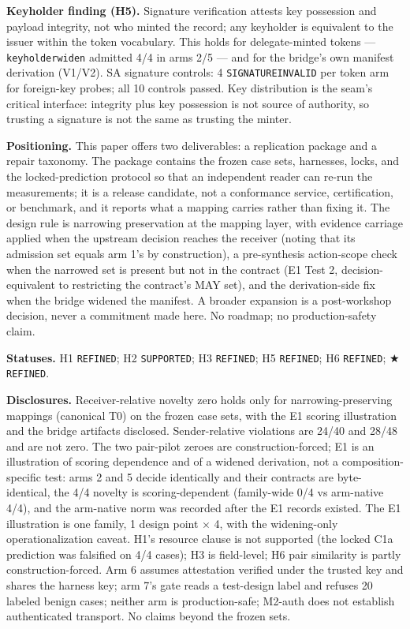 \documentclass[
  10pt,
]{article}
\let\origtexttt\texttt
\renewcommand{\texttt}[1]{{\upshape\origtexttt{#1}}}
\renewcommand{\_}{\allowbreak\origunderscore}
\begin{document}
\textbf{Keyholder finding (H5).} Signature verification attests key
possession and payload integrity, not who minted the record; any
keyholder is equivalent to the issuer within the token vocabulary. This
holds for delegate-minted tokens --- \texttt{keyholder\_widen} admitted
4/4 in arms 2/5 --- and for the bridge's own manifest derivation
(V1/V2). SA signature controls: 4 \texttt{SIGNATURE\_INVALID} per token
arm for foreign-key probes; all 10 controls passed. Key distribution is
the seam's critical interface: integrity plus key possession is not
source of authority, so trusting a signature is not the same as trusting
the minter.

\textbf{Positioning.} This paper offers two deliverables: a replication
package and a repair taxonomy. The package contains the frozen case
sets, harnesses, locks, and the locked-prediction protocol so that an
independent reader can re-run the measurements; it is a release
candidate, not a conformance service, certification, or benchmark, and
it reports what a mapping carries rather than fixing it. The design rule
is narrowing preservation at the mapping layer, with evidence carriage
applied when the upstream decision reaches the receiver (noting that its
admission set equals arm 1's by construction), a pre-synthesis
action-scope check when the narrowed set is present but not in the
contract (E1 Test 2, decision-equivalent to restricting the contract's
MAY set), and the derivation-side fix when the bridge widened the
manifest. A broader expansion is a post-workshop decision, never a
commitment made here. No roadmap; no production-safety claim.

\textbf{Statuses.} H1 \texttt{REFINED}; H2 \texttt{SUPPORTED}; H3
\texttt{REFINED}; H5 \texttt{REFINED}; H6 \texttt{REFINED}; ★
\texttt{REFINED}.

\textbf{Disclosures.} Receiver-relative novelty zero holds only for
narrowing-preserving mappings (canonical T0) on the frozen case sets,
with the E1 scoring illustration and the bridge artifacts disclosed.
Sender-relative violations are 24/40 and 28/48 and are not zero. The two
pair-pilot zeroes are construction-forced; E1 is an illustration of
scoring dependence and of a widened derivation, not a
composition-specific test: arms 2 and 5 decide identically and their
contracts are byte-identical, the 4/4 novelty is scoring-dependent
(family-wide 0/4 vs arm-native 4/4), and the arm-native norm was
recorded after the E1 records existed. The E1 illustration is one
family, 1 design point × 4, with the widening-only operationalization
caveat. H1's resource clause is not supported (the locked C1a prediction
was falsified on 4/4 cases); H3 is field-level; H6 pair similarity is
partly construction-forced. Arm 6 assumes attestation verified under the
trusted key and shares the harness key; arm 7's gate reads a test-design
label and refuses 20 labeled benign cases; neither arm is
production-safe; M2-auth does not establish authenticated transport. No
claims beyond the frozen sets.
\end{document}
